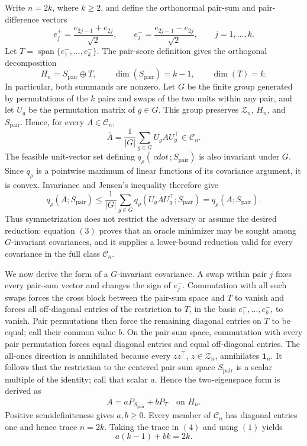 Write \(n=2k\), where \(k\geq2\), and define the orthonormal pair-sum and pair-difference vectors
\[
e_j^+=\frac{e_{2j-1}+e_{2j}}{\sqrt2},
\qquad
e_j^-=\frac{e_{2j-1}-e_{2j}}{\sqrt2},
\qquad j=1,\ldots,k.
\]
Let \(T=\operatorname{span}\{e_1^-,\ldots,e_k^-\}\).  The pair-score definition gives the orthogonal decomposition
\[
H_n=S_{\mathrm{pair}}\mathbin{\oplus}T,
\qquad
\dim(S_{\mathrm{pair}})=k-1,
\qquad
\dim(T)=k.
\tag{1}
\]
In particular, both summands are nonzero.  Let \(G\) be the finite group generated by permutations of the \(k\) pairs and swaps of the two units within any pair, and let \(U_g\) be the permutation matrix of \(g\in G\).  This group preserves \(\mathcal Z_n\), \(H_n\), and \(S_{\mathrm{pair}}\).  Hence, for every \(A\in\mathcal C_n\),
\[
\overline A=\frac1{|G|}\sum_{g\in G}U_gAU_g^\top\in\mathcal C_n.
\tag{2}
\]
The feasible unit-vector set defining \(q_\rho(\,cdot\,;S_{\mathrm{pair}})\) is also invariant under \(G\).  Since \(q_\rho\) is a pointwise maximum of linear functions of its covariance argument, it is convex.  Invariance and Jensen's inequality therefore give
\[
q_\rho(\overline A;S_{\mathrm{pair}})
\leq\frac1{|G|}\sum_{g\in G}
q_\rho(U_gAU_g^\top;S_{\mathrm{pair}})
=q_\rho(A;S_{\mathrm{pair}}).
\tag{3}
\]
Thus symmetrization does not restrict the adversary or assume the desired reduction: equation \((3)\) proves that an oracle minimizer may be sought among \(G\)-invariant covariances, and it supplies a lower-bound reduction valid for every covariance in the full class \(\mathcal C_n\).

We now derive the form of a \(G\)-invariant covariance.  A swap within pair \(j\) fixes every pair-sum vector and changes the sign of \(e_j^-\).  Commutation with all such swaps forces the cross block between the pair-sum space and \(T\) to vanish and forces all off-diagonal entries of the restriction to \(T\), in the basis \(e_1^-,\ldots,e_k^-\), to vanish.  Pair permutations then force the remaining diagonal entries on \(T\) to be equal; call their common value \(b\).  On the pair-sum space, commutation with every pair permutation forces equal diagonal entries and equal off-diagonal entries.  The all-ones direction is annihilated because every \(zz^\top\), \(z\in\mathcal Z_n\), annihilates \(\mathbf1_n\).  It follows that the restriction to the centered pair-sum space \(S_{\mathrm{pair}}\) is a scalar multiple of the identity; call that scalar \(a\).  Hence the two-eigenspace form is derived as
\[
\overline A=aP_{S_{\mathrm{pair}}}+bP_T
\quad\text{on }H_n.
\tag{4}
\]
Positive semidefiniteness gives \(a,b\geq0\).  Every member of \(\mathcal C_n\) has diagonal entries one and hence trace \(n=2k\).  Taking the trace in \((4)\) and using \((1)\) yields
\[
a(k-1)+bk=2k.
\tag{5}
\]

